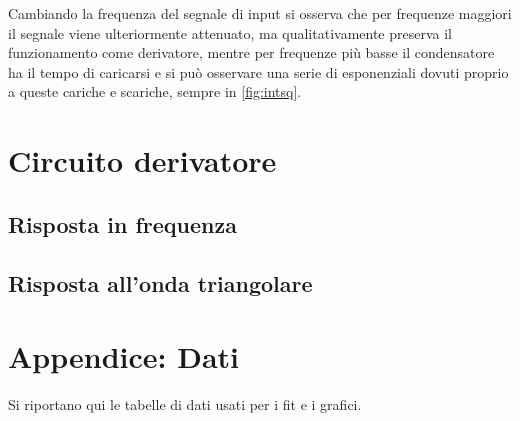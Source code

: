 \documentclass[10pt,a4paper]{article}
\begin{document}
Cambiando la frequenza del segnale di input si osserva che per frequenze maggiori il segnale viene ulteriormente attenuato, ma qualitativamente preserva il funzionamento come derivatore, mentre per frequenze più basse il condensatore ha il tempo di caricarsi e si può osservare una serie di esponenziali dovuti proprio a queste cariche e scariche, sempre in \figurename{\ref{fig:intsq}}.

\section{Circuito derivatore}

\subsection{Risposta in frequenza}

\subsection{Risposta all'onda triangolare}

\pagebreak
\section{Appendice: Dati}
Si riportano qui le tabelle di dati usati per i fit e i grafici.

\centering
\begin{figure}[h!]
	\begin{minipage}[c]{0.33\textwidth}
		\resizebox{1\textwidth}{!}{
		}
		\label{tab:inv_amp_gain}
	\end{minipage}
	\begin{minipage}[c]{0.33\textwidth}
		\resizebox{1\textwidth}{!}{
		}
		\label{tab:inv_amp_f_domain}
	\end{minipage}
	\begin{minipage}[c]{0.33\textwidth}
		\resizebox{1\textwidth}{!}{
			}
		\label{tab:gain_bandwidth}
	\end{minipage}
\end{figure}

\begin{figure}[h!]
	\centering
	\resizebox{0.7\textwidth}{!}{
	}
	\label{tab:lowpass}
\end{figure}

\begin{figure}[h!]
	\centering
	\resizebox{0.7\textwidth}{!}{
	}
	\label{tab:highpass}
\end{figure}
\end{document}
